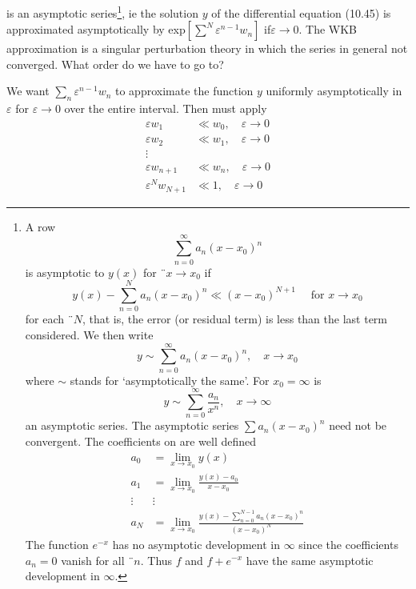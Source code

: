 is an asymptotic series\footnote{
    A row
    \begin{equation}
        \sum_{n=0}^{\infty} a_{n}\left(x-x_{0}\right)^{n}
        \end{equation}
    is asymptotic to $y (x)$ for $¨ x \rightarrow x_0$ if
    \begin{equation}
        y(x)-\sum_{n=0}^{N} a_{n}\left(x-x_{0}\right)^{n} \ll\left(x-x_{0}\right)^{N+1} \quad \text { for } x \rightarrow x_{0}
        \end{equation}
    for each ¨$ N$, that is, the error (or residual term) is less than the last term considered. We then write
    \begin{equation}
        y \sim \sum_{n=0}^{\infty} a_{n}\left(x-x_{0}\right)^{n}, \quad x \rightarrow x_{0}
        \end{equation}
    where $\sim$ stands for `asymptotically the same'. For $x_0 = \infty$ is
    \begin{equation}
        y \sim \sum_{n=0}^{\infty} \frac{a_{n}}{x^{n}}, \quad x \rightarrow \infty
        \end{equation}
        an asymptotic series. The asymptotic series $\sum a_n(x-x_0)^n$ need not be convergent. The coefficients on are well defined 
        \begin{equation}
        \begin{aligned} a_{0} &=\lim _{x \rightarrow x_{0}} y(x) \\ a_{1} &=\lim _{x \rightarrow x_{0}} \frac{y(x)-a_{0}}{x-x_{0}} \\ \vdots & \vdots \\ a_{N} &=\lim _{x \rightarrow x_{0}} \frac{y(x)-\sum_{n=0}^{N-1} a_{n}\left(x-x_{0}\right)^{n}}{\left(x-x_{0}\right)^{N}} \end{aligned}
        \end{equation}
        The function $e^{-x}$ has no asymptotic development in $\infty$ since the coefficients $a_n = 0$ vanish for all $¨ n$. Thus $f$ and $f + e^{-x}$ have the same asymptotic development in $\infty$.
}, ie the solution $y$ of the differential equation (10.45) is approximated asymptotically by exp$[\sum^N \varepsilon^{n-1}w_n]$ if ​​$\varepsilon\rightarrow 0$. The WKB approximation is a singular perturbation theory in which the series in general not converged. What order do we have to go to?

We want $\sum_n\varepsilon^{n-1}w_n$ to approximate the function $y$ uniformly asymptotically in $\varepsilon$ for $\varepsilon\rightarrow 0$ over the entire interval. Then must apply
\begin{align} \varepsilon w_{1} & \ll w_{0}, \quad \varepsilon \rightarrow 0 \nonumber\\ \varepsilon w_{2} & \ll w_{1}, \quad \varepsilon \rightarrow 0 \nonumber\\ \vdots &\nonumber\\ \varepsilon w_{n+1} & \ll w_{n}, \quad \varepsilon \rightarrow 0 \\ \varepsilon^{N} w_{N+1} & \ll 1, \quad \varepsilon \rightarrow 0 \end{align}

